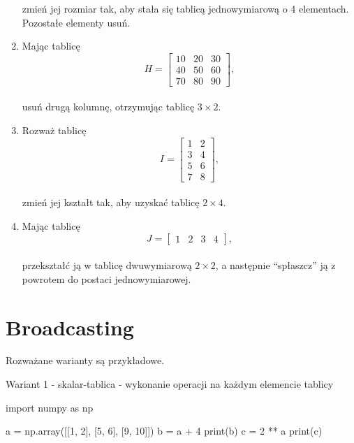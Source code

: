 \documentclass[
  polish,
  letterpaper,
  DIV=11,
  numbers=noendperiod]{scrreprt}
\newenvironment{Shaded}{\begin{snugshade}}{\end{snugshade}}
\newcommand{\BuiltInTok}[1]{\textcolor[rgb]{0.00,0.23,0.31}{#1}}
\newcommand{\DecValTok}[1]{\textcolor[rgb]{0.68,0.00,0.00}{#1}}
\newcommand{\ImportTok}[1]{\textcolor[rgb]{0.00,0.46,0.62}{#1}}
\newcommand{\NormalTok}[1]{\textcolor[rgb]{0.00,0.23,0.31}{#1}}
\newcommand{\OperatorTok}[1]{\textcolor[rgb]{0.37,0.37,0.37}{#1}}
\begin{document}
\begin{enumerate}
  zmień jej rozmiar tak, aby stała się tablicą jednowymiarową o 4
  elementach. Pozostałe elementy usuń.
\item
  Mając tablicę\\
  \[H = \begin{bmatrix}10 & 20 & 30 \\ 40 & 50 & 60 \\ 70 & 80 & 90\end{bmatrix},\]\\
  usuń drugą kolumnę, otrzymując tablicę \(3 \times 2\).
\item
  Rozważ tablicę\\
  \[I = \begin{bmatrix}1 & 2 \\ 3 & 4 \\ 5 & 6 \\ 7 & 8\end{bmatrix},\]\\
  zmień jej kształt tak, aby uzyskać tablicę \(2 \times 4\).
\item
  Mając tablicę\\
  \[J = \begin{bmatrix}1 & 2 & 3 & 4\end{bmatrix},\]\\
  przekształć ją w tablicę dwuwymiarową \(2 \times 2\), a następnie
  ``spłaszcz'' ją z powrotem do postaci jednowymiarowej.
\end{enumerate}

\chapter{Broadcasting}\label{broadcasting}

Rozważane warianty są przykładowe.

Wariant 1 - skalar-tablica - wykonanie operacji na każdym elemencie
tablicy

\begin{Shaded}
\begin{Highlighting}[]
\ImportTok{import}\NormalTok{ numpy }\ImportTok{as}\NormalTok{ np}

\NormalTok{a }\OperatorTok{=}\NormalTok{ np.array([[}\DecValTok{1}\NormalTok{, }\DecValTok{2}\NormalTok{], [}\DecValTok{5}\NormalTok{, }\DecValTok{6}\NormalTok{], [}\DecValTok{9}\NormalTok{, }\DecValTok{10}\NormalTok{]])}
\NormalTok{b }\OperatorTok{=}\NormalTok{ a }\OperatorTok{+} \DecValTok{4}
\BuiltInTok{print}\NormalTok{(b)}
\NormalTok{c }\OperatorTok{=} \DecValTok{2} \OperatorTok{**}\NormalTok{ a}
\BuiltInTok{print}\NormalTok{(c)}
\end{Highlighting}
\end{Shaded}
\end{document}
